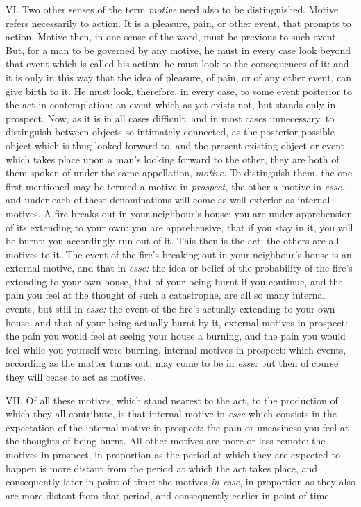 \documentclass[12pt]{report}
\begin{document}
VI. Two other senses of the term \emph{motive} need also to be
distinguished. Motive refers necessarily to action. It is a pleasure,
pain, or other event, that prompts to action. Motive then, in one sense
of the word, must be previous to such event. But, for a man to be
governed by any motive, he must in every case look beyond that event
which is called his action; he must look to the consequences of it: and
it is only in this way that the idea of pleasure, of pain, or of any
other event, can give birth to it. He must look, therefore, in every
case, to some event posterior to the act in contemplation: an event
which as yet exists not, but stands only in prospect. Now, as it is in
all cases difficult, and in most cases unnecessary, to distinguish
between objects so intimately connected, as the posterior possible
object which is thug looked forward to, and the present existing object
or event which takes place upon a man's looking forward to the other,
they are both of them spoken of under the same appellation,
\emph{motive.} To distinguish them, the one first mentioned may be
termed a motive in \emph{prospect,} the other a motive in \emph{esse:}
and under each of these denominations will come as well exterior as
internal motives. A fire breaks out in your neighbour's house: you are
under apprehension of its extending to your own: you are apprehensive,
that if you stay in it, you will be burnt: you accordingly run out of
it. This then is the act: the others are all motives to it. The event of
the fire's breaking out in your neighbour's house is an external motive,
and that in \emph{esse:} the idea or belief of the probability of the
fire's extending to your own house, that of your being burnt if you
continue, and the pain you feel at the thought of such a catastrophe,
are all so many internal events, but still in \emph{esse:} the event of
the fire's actually extending to your own house, and that of your being
actually burnt by it, external motives in prospect: the pain you would
feel at seeing your house a burning, and the pain you would feel while
you yourself were burning, internal motives in prospect: which events,
according as the matter turns out, may come to be in \emph{esse:} but
then of course they will cease to act as motives.

VII. Of all these motives, which stand nearest to the act, to the
production of which they all contribute, is that internal motive in
\emph{esse} which consists in the expectation of the internal motive in
prospect: the pain or uneasiness you feel at the thoughts of being
burnt. All other motives are more or less remote: the motives in
prospect, in proportion as the period at which they are expected to
happen is more distant from the period at which the act takes place, and
consequently later in point of time: the motives \emph{in esse}, in
proportion as they also are more distant from that period, and
consequently earlier in point of time.
\end{document}

